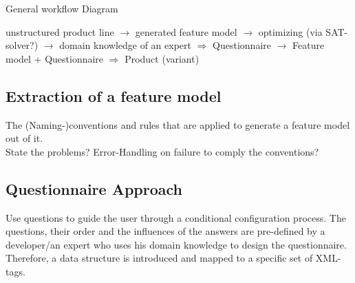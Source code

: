 General workflow Diagram

unstructured product line $\rightarrow$ generated feature model $\rightarrow$ optimizing (via SAT-solver?) $\rightarrow$ domain knowledge of an expert $\Rightarrow$ Questionnaire $\rightarrow$ Feature model + Questionnaire $\Rightarrow$ Product (variant)


\subsection{Extraction of a feature model}
The (Naming-)conventions and rules that are applied to generate a feature model out of it.\\
State the problems? Error-Handling on failure to comply the conventions?

\subsection{Questionnaire Approach}
Use questions to guide the user through a conditional configuration process. The questions, their order and the influences of the answers are pre-defined by a developer/an expert who uses his domain knowledge to design the questionnaire. Therefore, a data structure is introduced and mapped to a specific set of XML-tags.